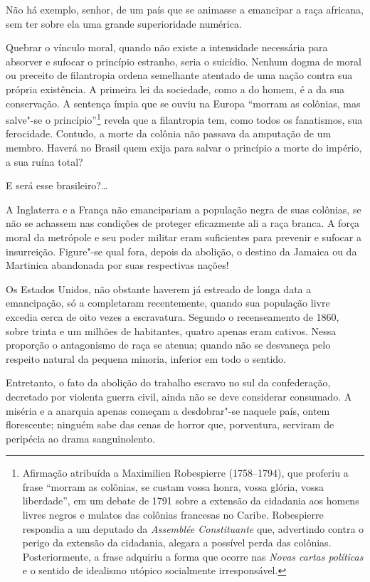 \begin{linenumbers}

Não há exemplo, senhor, de um país que se animasse a emancipar a raça
africana, sem ter sobre ela uma grande superioridade numérica.

Quebrar o vínculo moral, quando não existe a intensidade necessária para
absorver e sufocar o princípio estranho, seria o suicídio. Nenhum dogma
de moral ou preceito de filantropia ordena semelhante atentado de uma
nação contra sua própria existência. A primeira lei da sociedade, como
a do homem, é a da sua conservação. A sentença ímpia que se ouviu na
Europa ``morram as colônias, mas salve"-se o
princípio''\footnote{ Afirmação atribuída a Maximilien Robespierre (1758--1794), que
proferiu a frase ``morram as colônias, se custam vossa honra, vossa
glória, vossa liberdade'', em um debate de 1791 sobre a extensão da
cidadania aos homens livres negros e mulatos das colônias francesas no
Caribe. Robespierre respondia a um deputado da \textit{Assemblée Constituante} 
que, advertindo contra o perigo da extensão da
cidadania, alegara a possível perda das colônias. Posteriormente, a
frase adquiriu a forma que ocorre nas \textit{Novas cartas políticas} e
o sentido de idealismo utópico socialmente irresponsável.}
 revela que a filantropia tem, como todos os fanatismos, sua ferocidade.
Contudo, a morte da colônia não passava da amputação de um membro.
Haverá no Brasil quem exija para salvar o princípio a morte do império, a sua ruína total?

E será esse brasileiro?\ldots{}

A Inglaterra e a França não emancipariam a população negra de suas
colônias, se não se achassem nas condições de proteger eficazmente ali
a raça branca. A força moral da metrópole e seu poder militar eram
suficientes para prevenir e sufocar a insurreição. Figure"-se qual
fora, depois da abolição, o destino da Jamaica ou da Martinica
abandonada por suas respectivas nações!

Os Estados Unidos, não obstante haverem já estreado de longa data a
emancipação, só a completaram recentemente, quando sua população livre
excedia cerca de oito vezes a escravatura. Segundo o recenseamento de
1860, sobre trinta e um milhões de habitantes, quatro apenas eram
cativos. Nessa proporção o antagonismo de raça se atenua; quando não se
desvaneça pelo respeito natural da pequena minoria, inferior em todo o sentido.

Entretanto, o fato da abolição do trabalho escravo no sul da
confederação, decretado por violenta guerra civil, ainda não se deve
considerar consumado. A miséria e a anarquia apenas começam a
desdobrar"-se naquele país, ontem florescente; ninguém sabe das cenas
de horror que, porventura, serviram de peripécia ao drama sanguinolento. 


\end{linenumbers}
